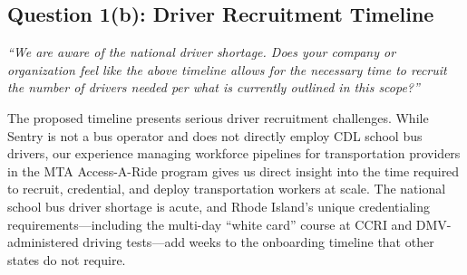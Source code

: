 \subsection{Question 1(b): Driver Recruitment Timeline}
\textit{``We are aware of the national driver shortage. Does your company or organization feel like the above timeline allows for the necessary time to recruit the number of drivers needed per what is currently outlined in this scope?''}

\vspace{0.3cm}

The proposed timeline presents serious driver recruitment challenges. While Sentry is not a bus operator and does not directly employ CDL school bus drivers, our experience managing workforce pipelines for transportation providers in the MTA Access-A-Ride program gives us direct insight into the time required to recruit, credential, and deploy transportation workers at scale. The national school bus driver shortage is acute, and Rhode Island's unique credentialing requirements---including the multi-day ``white card'' course at CCRI and DMV-administered driving tests---add weeks to the onboarding timeline that other states do not require.

